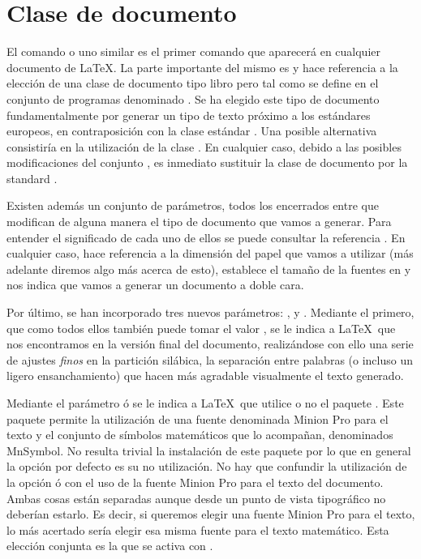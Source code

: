\section{Clase de documento}
El comando  o uno similar es el primer comando que aparecerá en cualquier documento de \LaTeX. La parte importante del mismo es  y hace referencia a la elección de una  clase de documento tipo libro pero tal como se define en el conjunto de programas denominado . Se ha elegido este tipo de documento fundamentalmente por generar un tipo de texto próximo a los estándares europeos, en contraposición con la clase estándar . Una posible alternativa consistiría en la utilización de la clase . En cualquier caso, debido a las posibles modificaciones del conjunto , es inmediato sustituir la clase de documento por la standard .

Existen además un conjunto de parámetros, todos los encerrados entre \ttcolor{[...]} que modifican de alguna manera el tipo de documento que vamos a generar. Para entender el significado de cada uno de ellos se puede consultar la referencia \cite{koma}. En cualquier caso,  hace referencia a la dimensión del papel que vamos a utilizar (más adelante diremos algo más acerca de esto), \ttcolor{10pt} establece el tamaño de la fuentes en  y  nos indica que vamos a generar un documento a doble cara. 

Por último, se han incorporado tres nuevos parámetros: ,  y . Mediante el primero, que como todos ellos también puede tomar el valor , se le indica a \LaTeX\ que nos encontramos en la versión final del documento, realizándose con ello una serie de ajustes \emph{finos} en la partición silábica, la separación entre palabras (o incluso un ligero ensanchamiento) que hacen más agradable visualmente el texto generado. 

Mediante el parámetro  ó  se le indica a  \LaTeX\ que utilice o no el paquete . Este paquete permite la utilización de una fuente denominada Minion Pro para el texto y el conjunto de símbolos matemáticos que lo acompañan, denominados MnSymbol. No resulta trivial la instalación de este paquete por lo que en general la opción por defecto es su no utilización. No hay que confundir la utilización de la opción  ó  con el uso de la fuente Minion Pro para el texto del documento. Ambas cosas están separadas aunque desde un punto de vista tipográfico no deberían estarlo. Es decir, si queremos elegir una fuente Minion Pro para el texto, lo más acertado sería elegir esa misma fuente para el texto matemático. Esta elección conjunta es la que se activa con .

